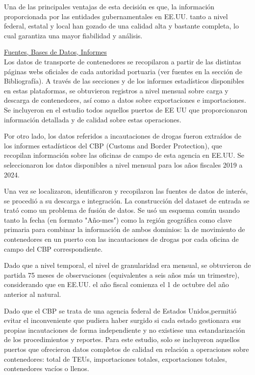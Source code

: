 \documentclass[12pt]{article}
\begin{document}
		Una de las principales ventajas de esta decisión es que, la información proporcionada por las entidades gubernamentales en EE.UU. tanto a nivel federal, estatal y local han gozado de una calidad alta y bastante completa, lo cual garantiza una mayor fiabilidad y análisis.
		
		\underline{Fuentes, Bases de Datos, Informes}\\
		Los datos de transporte de contenedores se recopilaron a partir de las distintas páginas webs oficiales de cada autoridad portuaria (ver fuentes en la sección de Bibliografía). A través de las secciones y de los informes estadísticos disponibles en estas plataformas, se obtuvieron registros a nivel mensual sobre carga y descarga de contenedores, así como a datos sobre exportaciones e importaciones. Se incluyeron en el estudio todos aquellos puertos de EE UU que proporcionaron información detallada y de calidad sobre estas operaciones.
		
		Por otro lado, los datos referidos a incautaciones de drogas fueron extraídos de los informes estadísticos del CBP (Customs and Border Protection), que recopilan información sobre las oficinas de campo de esta agencia en EE.UU. Se seleccionaron los datos disponibles a nivel mensual para los años fiscales 2019 a 2024.
		
		
		Una vez se localizaron, identificaron y recopilaron las fuentes de datos de interés, se procedió a su descarga e integración. La construcción del dataset de entrada se trató como un problema de fusión de datos. Se usó un esquema común usando tanto la fecha (en formato "Año-mes") como la región geográfica como clave primaria para combinar la información de ambos dominios: la de movimiento de contenedores en un puerto con las incautaciones de drogas por cada oficina de campo del CBP correspondiente.
		
		Dado que a nivel temporal, el nivel de granularidad era mensual, se obtuvieron de partida 75 meses de observaciones (equivalentes a seis años más un trimestre), considerando que en EE.UU. el año fiscal comienza el 1 de octubre del año anterior al natural.
		
		Dado que el CBP se trata de una agencia federal de Estados Unidos,permitió evitar el inconveniente que pudiera haber surgido si cada estado gestionara sus propias incautaciones de forma independiente y no existiese una estandarización de los procedimientos y reportes. Para este estudio, solo se incluyeron aquellos puertos que ofrecieron datos completos de calidad en relación a operaciones sobre contenedores: total de TEUs, importaciones totales, exportaciones totales, contenedores vacíos o llenos.
		
\end{document}

